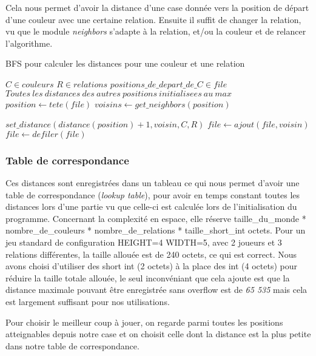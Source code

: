 Cela nous permet d'avoir la distance d'une case donnée vers la position de départ d'une couleur avec une certaine relation. 
Ensuite il suffit de changer la relation, vu que le module \emph{neighbors} s'adapte à la relation,  et/ou la couleur et de relancer l'algorithme.

\begin{algorithm}
    \caption{BFS pour calculer les distances pour une couleur et une relation}\label{alg:cap}
    \label{alg:BFS}
    \begin{algorithmic}
    \Require $C \in couleurs$
    \Require $R \in relations$
    \Require $positions\_de\_depart\_de\_C \in file $
    \Require $Toutes\ les\ distances\ des\ autres\ positions\ initialisees\ au\ max$
    \State $position \gets tete(file)$
    \State $voisins \gets get\_neighbors(position)$

        \State $set\_distance(distance(position) + 1, voisin, C, R)$
        \State $file \gets ajout(file, voisin)$
    \EndIf
    \EndFor
    \State $file \gets defiler(file)$
    \EndWhile
    \end{algorithmic}
\end{algorithm}

\subsubsection{Table de correspondance}

Ces distances sont enregistrées dans un tableau ce qui nous permet d'avoir une table de correspondance (\emph{lookup table}),
pour avoir en temps constant toutes les distances lors d'une partie vu que celle-ci est calculée lors de l'initialisation
du programme. Concernant la complexité en espace, elle réserve 
taille\_du\_monde * nombre\_de\_couleurs * nombre\_de\_relations * taille\_short\_int octets. Pour un jeu standard de configuration
 HEIGHT=4 WIDTH=5, avec 2 joueurs et 3 relations différentes, la taille allouée est de 240 octets, ce qui est correct.
Nous avons choisi d'utiliser des short int (2 octets) à la place des int (4 octets) pour réduire la taille totale allouée,
le seul inconvéniant que cela ajoute est que la distance maximale pouvant être enregistrée sans overflow est de \emph{65 535} mais cela
est largement suffisant pour nos utilisations.

Pour choisir le meilleur coup à jouer, on regarde parmi toutes les positions atteignables depuis 
notre case et on choisit celle dont la distance est la plus petite dans notre table de correspondance.

